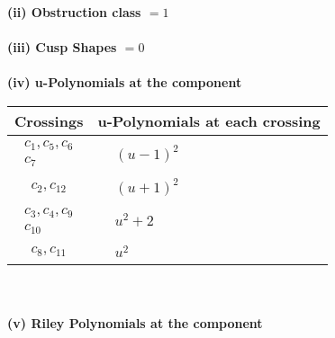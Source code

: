 \documentclass[1p]{elsarticle_modified}
\theoremstyle{definition}
\begin{document}
\flushleft \textbf{(ii) Obstruction class $= 1$}\\~\\
\flushleft \textbf{(iii) Cusp Shapes $= 0$}\\~\\
\newpage\renewcommand{\arraystretch}{1}
\flushleft \textbf{(iv) u-Polynomials at the component}\newline \\
\begin{tabular}{m{50pt}|m{274pt}}
Crossings & \hspace{64pt}u-Polynomials at each crossing \\
\hline $$\begin{aligned}c_{1},c_{5},c_{6}\\c_{7}\end{aligned}$$&$\begin{aligned}
&(u-1)^2
\end{aligned}$\\
\hline $$\begin{aligned}c_{2},c_{12}\end{aligned}$$&$\begin{aligned}
&(u+1)^2
\end{aligned}$\\
\hline $$\begin{aligned}c_{3},c_{4},c_{9}\\c_{10}\end{aligned}$$&$\begin{aligned}
&u^2+2
\end{aligned}$\\
\hline $$\begin{aligned}c_{8},c_{11}\end{aligned}$$&$\begin{aligned}
&u^2
\end{aligned}$\\
\hline
\end{tabular}\\~\\
\newpage\renewcommand{\arraystretch}{1}
\flushleft \textbf{(v) Riley Polynomials at the component}\newline \\
\end{document}
